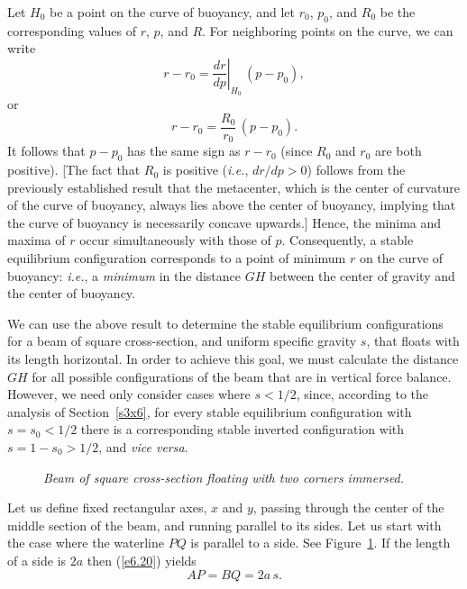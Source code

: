 Let $H_0$ be a point on the curve of buoyancy, 
and let $r_0$, $p_0$, and $R_0$ be the corresponding values of $r$, $p$, and $R$. For neighboring points on the curve, we can write
\begin{equation}
r-r_0=\left. \frac{dr}{dp}\right|_{H_0}\,(p-p_0),
\end{equation}
or
\begin{equation}
r -r_0 = \frac{R_0}{r_0}\,(p-p_0).
\end{equation}
It follows that $p-p_0$ has the same sign as $r-r_0$ (since $R_0$ and $r_0$ are both positive). [The fact that $R_0$ is positive
({\em i.e.}, $dr/dp>0$)
follows from the previously established result that the metacenter, which is the center of curvature of the curve of buoyancy,   always lies above the center of buoyancy,  implying 
 that the curve of
buoyancy is necessarily  concave upwards.]
Hence,
the minima and maxima of $r$ occur simultaneously with those of $p$. Consequently, a stable equilibrium
configuration corresponds to a point of minimum  $r$ on the curve of buoyancy:
{\em i.e.}, a {\em minimum}\/ in the distance $GH$ between the center of gravity and the center of buoyancy.

We can use the above result to determine the stable equilibrium configurations for a beam of
square cross-section, and uniform specific gravity $s$, that  floats with its length horizontal. 
In order to achieve this goal, we must calculate the distance $GH$ for all possible configurations
of the beam that are in vertical force balance. However, we need only consider cases where $s<1/2$, since, according to
the analysis of Section~\ref{s3x6}, for every stable equilibrium configuration with  $s=s_0<1/2$
there is a corresponding stable inverted configuration with $s = 1-s_0>1/2$, and {\em vice versa}. 

\begin{figure}
\epsfysize=3in
\centerline{}
\caption{\em Beam of square cross-section floating with two corners immersed.}\label{f6.03}
\end{figure}

Let us define fixed rectangular axes, $x$ and $y$,  passing through the center of the middle section of the beam, and running parallel
to its sides. Let us start with the case where the waterline $PQ$ is parallel to a side. See Figure~\ref{f6.03}.
If the length of a side is $2a$ then (\ref{e6.20})
yields
\begin{equation}
AP=BQ=2a\,s.
\end{equation}

